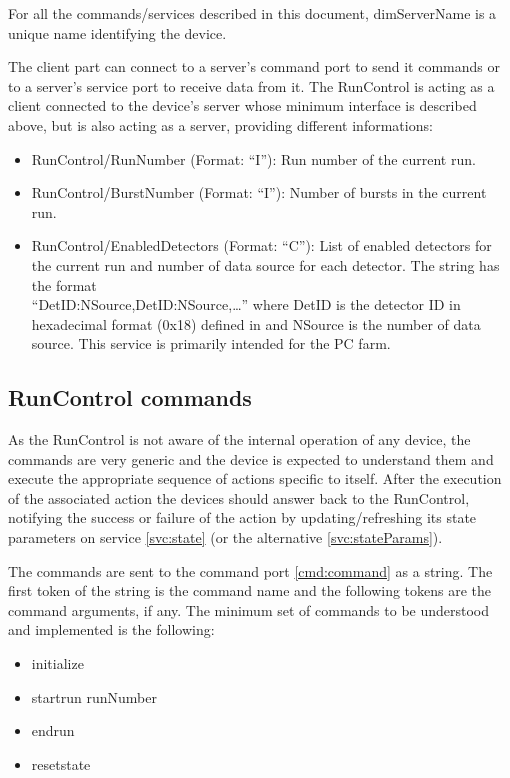 \documentclass[a4paper]{article}
\begin{document}
For all the commands/services described in this document, dimServerName is a unique name identifying
the device.

The client part can connect to a server's command port to send it commands or to a server's
service port to receive data from it. The RunControl is acting as a client connected to the device's
server whose minimum interface is described above, but is also acting as a server, providing different informations:
\begin{itemize}
	\item RunControl/RunNumber (Format: ``I''): Run number of the current run.
	\item RunControl/BurstNumber (Format: ``I''): Number of bursts in the current run.
	\item RunControl/EnabledDetectors (Format: ``C''): List of enabled detectors for the current run
	and number of data source for each detector. The string has the format\\ 
	\mbox{``DetID:NSource,DetID:NSource,\ldots''} where DetID is the detector ID in hexadecimal format
	(0x18) defined in \cite{biblio:TDAQNote} and NSource is the number of data source. This
	service is primarily intended for the PC farm.
\end{itemize}

\subsection{RunControl commands}\label{sec:commands}

As the RunControl is not aware of the internal operation of any device, the commands are very
generic and the device is expected to understand them and execute the appropriate sequence of actions
specific to itself. After the execution of the associated action the devices should answer back to
the RunControl, notifying the success or failure of the action by updating/refreshing its state
parameters on service \ref{svc:state} (or the alternative \ref{svc:stateParams}).

The commands are sent to the command port \ref{cmd:command} as a string. The first token of the
string is the command name and the following tokens are the command arguments, if any. The minimum
set of commands to be understood and implemented is the following:
\begin{itemize}
	\item initialize
	\item startrun runNumber
	\item endrun
	\item resetstate
\end{itemize}
\end{document}
